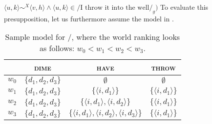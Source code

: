 \linebreak\emptyfill$\langle u,k\rangle\sim^X\langle v,h\rangle\land\langle u,k\rangle\in/\text{I throw it into the well}/_g)$
\xe
To evaluate this presupposition, let us furthermore assume the model in .
\begin{table}[!htb]
\caption{Sample model for /, where the world ranking looks as follows: $w_0<w_1<w_2<w_3$.}
    \begin{tabular}{lccc}\toprule
            & {\scshape dime} & {\scshape have} & {\scshape throw}\\\midrule
            $w_0$ & $\{d_1,d_2,d_3\}$ & $\emptyset$ & $\emptyset$\\
            $w_1$ & $\{d_1,d_2,d_3\}$ & $\{\langle i,d_1\rangle\}$ & $\{\langle i,d_1\rangle\}$\\
            $w_2$ & $\{d_1,d_2,d_3\}$ & $\{\langle i,d_1\rangle,\langle i,d_2\rangle\}$ & $\{\langle i,d_1\rangle\}$\\
            $w_3$ & $\{d_1,d_2,d_3\}$ & $\{\langle i,d_1\rangle,\langle i,d_2\rangle,\langle i,d_3\rangle\}$ & $\{\langle i,d_1\rangle\}$\\
          \bottomrule
    \end{tabular}
\end{table}

